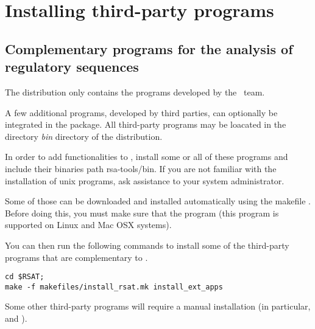 \documentclass[12pt,a4paper, oneside]{scrreprt} %
\begin{document}
\chapter{Installing third-party programs}

\section{Complementary programs for the analysis of regulatory
  sequences}

The \RSAT distribution only contains the programs developed by the
\RSAT \ team. 

A few additional programs, developed by third parties, can optionally
be integrated in the package. All third-party programs may be loacated
in the directory \emph{bin} directory of the \RSAT distribution.  

In order to add functionalities to \RSAT, install some or all of these
programs and include their binaries path rsa-tools/bin. If you are not
familiar with the installation of unix programs, ask assistance to
your system administrator.

Some of those can be downloaded and installed automatically using the
makefile . Before doing this, you must make
sure that the program  (this program is supported on
Linux  and Mac OSX
systems).

You can then run the following commands to install some of the
third-party programs that are complementary to \RSAT.

\begin{lstlisting}
cd $RSAT;
make -f makefiles/install_rsat.mk install_ext_apps
\end{lstlisting}

Some other third-party programs will require a manual installation (in
particular,  and ).
\end{document}
